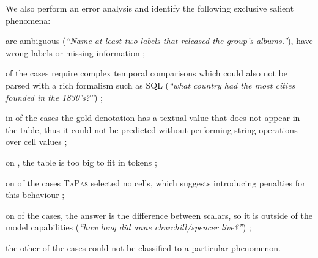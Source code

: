 \documentclass[11pt,a4paper]{article}
\newcommand{\ours}{\textsc{TaPas}\xspace}
\begin{document}
We also perform an error analysis and identify the following exclusive salient phenomena:
\begin{enumerate*}[label={(\roman*)},font=\bfseries\em]
\item  are ambiguous (\emph{``Name at least two labels that released the group's albums.''}), have wrong labels or missing information ;
\item  of the cases require complex temporal comparisons which could also not be parsed with a rich formalism such as SQL (\emph{``what country had the most cities founded in the 1830's?''}) ;
\item in  of the cases the gold denotation has a textual value that does not appear in the table, thus it could not be predicted without performing string operations over cell values ;
\item on , the table is too big to fit in  tokens ;
\item on  of the cases \ours selected no cells, which suggests introducing penalties for this behaviour ;
\item on  of the cases, the answer is the difference between scalars, so it is outside of the model capabilities (\emph{``how long did anne churchill/spencer live?''}) ;
\item the other  of the cases could not be classified to a particular phenomenon.
\end{enumerate*}
\end{document}

